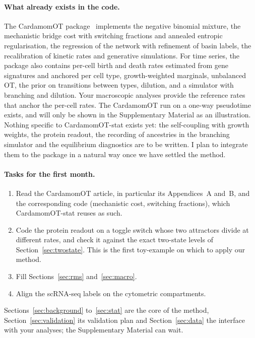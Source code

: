\documentclass[a4paper, 11pt]{article}
\theoremstyle{plain}
\theoremstyle{remark}
\begin{document}
\paragraph{What already exists in the code.} The CardamomOT package~\cite{mauge2026cardamomot} implements the negative binomial mixture, the mechanistic bridge cost with switching fractions and annealed entropic regularisation, the regression of the network with refinement of basin labels, the recalibration of kinetic rates and generative simulations. For time series, the package also contains per-cell birth and death rates estimated from gene signatures and anchored per cell type, growth-weighted marginals, unbalanced OT, the prior on transitions between types, dilution, and a simulator with branching and dilution. Your macroscopic analyses provide the reference rates that anchor the per-cell rates. The CardamomOT run on a one-way pseudotime exists, and will only be shown in the Supplementary Material as an illustration. Nothing specific to CardamomOT-stat exists yet: the self-coupling with growth weights, the protein readout, the recording of ancestries in the branching simulator and the equilibrium diagnostics are to be written. I plan to integrate them to the package in a natural way once we have settled the method.

\paragraph{Tasks for the first month.}
\begin{enumerate}[nosep]
\item Read the CardamomOT article, in particular its Appendices~A and~B, and the corresponding code (mechanistic cost, switching fractions), which CardamomOT-stat reuses as such.
\item Code the protein readout on a toggle switch whose two attractors divide at different rates, and check it against the exact two-state levels of Section~\ref{sec:twostate}. This is the first toy-example on which to apply our method.
\item Fill Sections~\ref{sec:rms} and~\ref{sec:macro}.
\item Align the scRNA-seq labels on the cytometric compartments.
\end{enumerate}
Sections~\ref{sec:background} to~\ref{sec:stat} are the core of the method, Section~\ref{sec:validation} its validation plan and Section~\ref{sec:data} the interface with your analyses; the Supplementary Material can wait.
\end{document}
